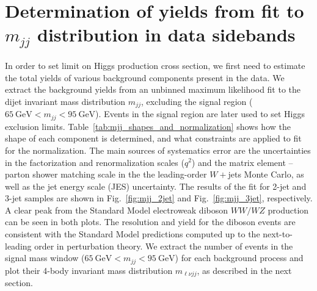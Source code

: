 \section{Determination of yields from fit to $m_{jj}$ distribution in data sidebands}
\label{sec:yieldsDetermination}


\label{sec:mjj_fit}
In order to set limit on Higgs production cross section, we first need to 
estimate the total yields of various background components present in the 
data.
We extract the background yields from 
an unbinned maximum likelihood fit to the 
dijet invariant mass distribution $m_{jj}$,  
excluding the signal region (
$65~{\mbox{GeV}} < m_{jj} < 95~{\mbox{GeV}}$). 
Events in the signal region are later used 
to set Higgs exclusion limits. 
Table~\ref{tab:mjj_shapes_and_normalization} shows how the 
shape of each component is determined, and what constraints 
are applied to fit for the normalization. 
The main sources of 
systematics error are the uncertainties in the factorization 
and renormalization scales ($q^2$) and the matrix element -- parton shower 
matching scale in the the leading-order $W+$jets Monte Carlo, as well as 
the jet energy scale (JES) uncertainty. 
The results of the fit for 2-jet and 3-jet samples are shown 
in Fig.~\ref{fig:mjj_2jet} and Fig.~\ref{fig:mjj_3jet}, respectively. 
A clear peak from the Standard Model electroweak diboson 
$WW/WZ$ production can be seen in both plots. 
The resolution and yield for the diboson events are 
consistent with the Standard Model predictions computed up to 
the next-to-leading order in perturbation theory.
We extract the number of events in the signal mass window 
($65~{\mbox{GeV}} < m_{jj} < 95~{\mbox{GeV}}$) for each 
background process 
and plot their 4-body invariant mass distribution $m_{\ell\nu jj}$, 
as described in the next section.
